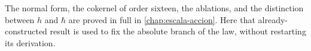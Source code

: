The normal form, the cokernel of order sixteen, the ablations, and the
distinction between \(h\) and \(\hbar\) are proved in full in
\cref{chap:escala-accion}. Here that already-constructed result is used to
fix the absolute branch of the law, without restarting its derivation.
\begingroup
\let\chapter\section
\let\section\subsection
\let\subsection\subsubsection
\let\subsubsection\paragraph
\let\clearpage\relax

\endgroup
\begingroup
\let\chapter\section
\let\section\subsection
\let\subsection\subsubsection
